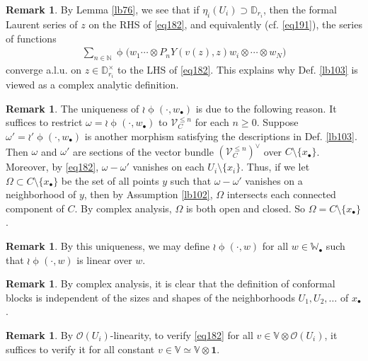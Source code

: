 \documentclass[11pt,b5paper,notitlepage]{article}
\theoremstyle{definition}
\newtheorem{rem}[df]{Remark}
\theoremstyle{plain}
\newcommand{\id}{\mathbf{1}}
\newcommand{\scr}{\mathscr}
\newcommand{\blt}{\bullet}
\newcommand{\Vbb}{\mathbb V}
\newcommand{\Wbb}{\mathbb W}
\newcommand{\Nbb}{\mathbb N}
\newcommand{\Dbb}{\mathbb D}
\numberwithin{equation}{section}
\begin{document}
\begin{rem}
By Lemma \ref{lb76}, we see that if $\eta_i(U_i)\supset\Dbb_{r_i}$, then the formal Laurent  series of $z$ on the RHS of \eqref{eq182}, and equivalently (cf. \eqref{eq191}), the series of functions
\begin{align*}
\sum_{n\in\Nbb}\upphi\big(w_1\cdots\otimes P_nY(v(z),z)w_i\otimes\cdots\otimes w_N\big)	
\end{align*}
converge a.l.u. on $z\in\Dbb_{r_i}^\times$ to the LHS of \eqref{eq182}. This explains why  Def. \ref{lb103} is viewed as a complex analytic definition.
\end{rem}


\begin{rem}
The uniqueness of $\wr\upphi(\cdot,w_\blt)$ is due to the following reason. It suffices to restrict $\omega=\wr\upphi(\cdot,w_\blt)$ to $\scr V^{\leq n}_C$ for each $n\geq 0$. Suppose $\omega'=\wr'\upphi(\cdot,w_\blt)$ is another morphism satisfying the descriptions in Def. \ref{lb103}.  Then $\omega$ and $\omega'$ are sections of the vector bundle $(\scr V_C^{\leq n})^\vee$ over $C\setminus\{x_\blt\}$. Moreover, by \eqref{eq182}, $\omega-\omega'$ vanishes on each $U_i\setminus\{x_i\}$.     Thus, if we let $\Omega\subset C\setminus\{x_\blt\}$ be the set of all points $y$ such that $\omega-\omega'$ vanishes on a neighborhood of $y$, then by Assumption \ref{lb102}, $\Omega$ intersects each connected component of $C$. By complex analysis, $\Omega$ is both open and closed. So $\Omega=C\setminus\{x_\blt\}$.
\end{rem}


\begin{rem}\label{lb191}
By this uniqueness, we may define $\wr\upphi(\cdot,w)$ for all $w\in\Wbb_\blt$ such that $\wr\upphi(\cdot,w)$ is linear over $w$.
\end{rem}

\begin{rem}
By complex analysis, it is clear that the definition of conformal blocks is independent of the sizes and shapes of the neighborhoods $U_1,U_2,\dots$ of $x_\blt$.
\end{rem}

\begin{rem}
By $\scr O(U_i)$-linearity, to verify \eqref{eq182} for all $v\in\Vbb\otimes\scr O(U_i)$, it suffices to verify it for all constant $v\in\Vbb\simeq \Vbb\otimes \id$.
\end{rem}




\subsection{}
\end{document}
